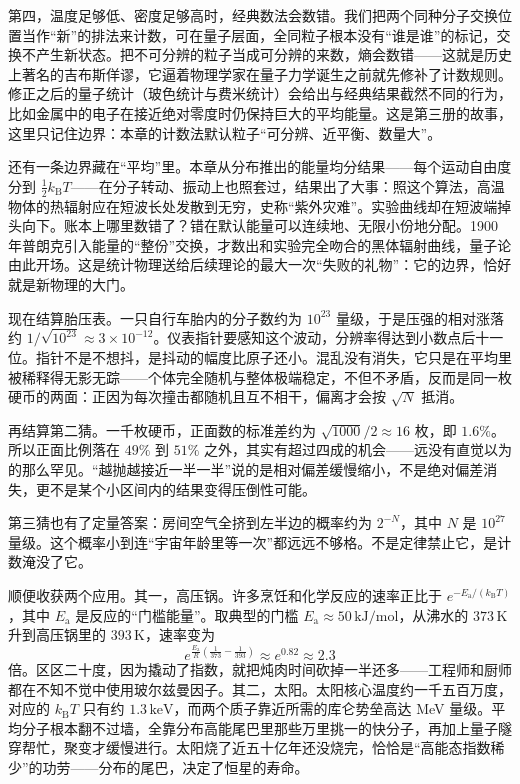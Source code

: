 第四，温度足够低、密度足够高时，经典数法会数错。我们把两个同种分子交换位置当作“新”的排法来计数，可在量子层面，全同粒子根本没有“谁是谁”的标记，交换不产生新状态。把不可分辨的粒子当成可分辨的来数，熵会数错——这就是历史上著名的吉布斯佯谬，它逼着物理学家在量子力学诞生之前就先修补了计数规则。修正之后的量子统计（玻色统计与费米统计）会给出与经典结果截然不同的行为，比如金属中的电子在接近绝对零度时仍保持巨大的平均能量。这是第三册的故事，这里只记住边界：本章的计数法默认粒子“可分辨、近平衡、数量大”。

还有一条边界藏在“平均”里。本章从分布推出的能量均分结果——每个运动自由度分到 \(\tfrac12 k_{\mathrm B}T\)——在分子转动、振动上也照套过，结果出了大事：照这个算法，高温物体的热辐射应在短波长处发散到无穷，史称“紫外灾难”。实验曲线却在短波端掉头向下。账本上哪里数错了？错在默认能量可以连续地、无限小份地分配。1900 年普朗克引入能量的“整份”交换，才数出和实验完全吻合的黑体辐射曲线，量子论由此开场。这是统计物理送给后续理论的最大一次“失败的礼物”：它的边界，恰好就是新物理的大门。


现在结算胎压表。一只自行车胎内的分子数约为 \(10^{23}\) 量级，于是压强的相对涨落约 \(1/\sqrt{10^{23}}\approx3\times10^{-12}\)。仪表指针要感知这个波动，分辨率得达到小数点后十一位。指针不是不想抖，是抖动的幅度比原子还小。混乱没有消失，它只是在平均里被稀释得无影无踪——个体完全随机与整体极端稳定，不但不矛盾，反而是同一枚硬币的两面：正因为每次撞击都随机且互不相干，偏离才会按 \(\sqrt{N}\) 抵消。

再结算第二猜。一千枚硬币，正面数的标准差约为 \(\sqrt{1000}/2\approx16\) 枚，即 \(1.6\%\)。所以正面比例落在 \(49\%\) 到 \(51\%\) 之外，其实有超过四成的机会——远没有直觉以为的那么罕见。“越抛越接近一半一半”说的是相对偏差缓慢缩小，不是绝对偏差消失，更不是某个小区间内的结果变得压倒性可能。

第三猜也有了定量答案：房间空气全挤到左半边的概率约为 \(2^{-N}\)，其中 \(N\) 是 \(10^{27}\) 量级。这个概率小到连“宇宙年龄里等一次”都远远不够格。不是定律禁止它，是计数淹没了它。

顺便收获两个应用。其一，高压锅。许多烹饪和化学反应的速率正比于 \(e^{-E_{\mathrm a}/(k_{\mathrm B}T)}\)，其中 \(E_{\mathrm a}\) 是反应的“门槛能量”。取典型的门槛 \(E_{\mathrm a}\approx50\,\mathrm{kJ/mol}\)，从沸水的 \(373\,\mathrm{K}\) 升到高压锅里的 \(393\,\mathrm{K}\)，速率变为
\[
e^{\frac{E_{\mathrm a}}{R}\left(\frac1{373}-\frac1{393}\right)} \approx e^{0.82} \approx 2.3
\]
倍。区区二十度，因为撬动了指数，就把炖肉时间砍掉一半还多——工程师和厨师都在不知不觉中使用玻尔兹曼因子。其二，太阳。太阳核心温度约一千五百万度，对应的 \(k_{\mathrm B}T\) 只有约 \(1.3\,\mathrm{keV}\)，而两个质子靠近所需的库仑势垒高达 MeV 量级。平均分子根本翻不过墙，全靠分布高能尾巴里那些万里挑一的快分子，再加上量子隧穿帮忙，聚变才缓慢进行。太阳烧了近五十亿年还没烧完，恰恰是“高能态指数稀少”的功劳——分布的尾巴，决定了恒星的寿命。

